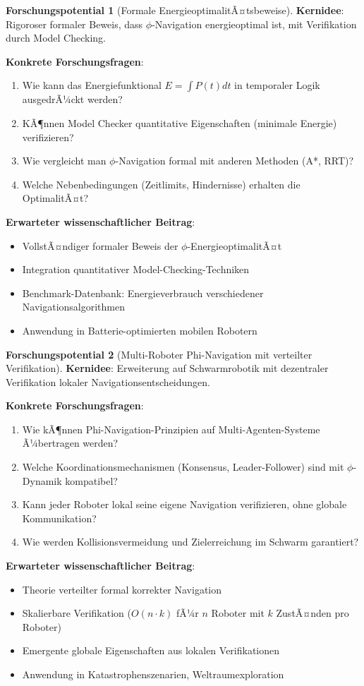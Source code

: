 ﻿\documentclass[a4paper,12pt]{article}
\theoremstyle{definition}
\newtheorem{potential}{Forschungspotential}[section]
\begin{document}
\begin{potential}[Formale EnergieoptimalitÃ¤tsbeweise]
\textbf{Kernidee}: Rigoroser formaler Beweis, dass $\phi$-Navigation energieoptimal ist, mit Verifikation durch Model Checking.

\textbf{Konkrete Forschungsfragen}:
\begin{enumerate}
	\item Wie kann das Energiefunktional $E = \int P(t) dt$ in temporaler Logik ausgedrÃ¼ckt werden?
	\item KÃ¶nnen Model Checker quantitative Eigenschaften (minimale Energie) verifizieren?
	\item Wie vergleicht man $\phi$-Navigation formal mit anderen Methoden (A*, RRT)?
	\item Welche Nebenbedingungen (Zeitlimits, Hindernisse) erhalten die OptimalitÃ¤t?
\end{enumerate}

\textbf{Erwarteter wissenschaftlicher Beitrag}:
\begin{itemize}
	\item VollstÃ¤ndiger formaler Beweis der $\phi$-EnergieoptimalitÃ¤t
	\item Integration quantitativer Model-Checking-Techniken
	\item Benchmark-Datenbank: Energieverbrauch verschiedener Navigationsalgorithmen
	\item Anwendung in Batterie-optimierten mobilen Robotern
\end{itemize}
\end{potential}

\begin{potential}[Multi-Roboter Phi-Navigation mit verteilter Verifikation]
\textbf{Kernidee}: Erweiterung auf Schwarmrobotik mit dezentraler Verifikation lokaler Navigationsentscheidungen.

\textbf{Konkrete Forschungsfragen}:
\begin{enumerate}
	\item Wie kÃ¶nnen Phi-Navigation-Prinzipien auf Multi-Agenten-Systeme Ã¼bertragen werden?
	\item Welche Koordinationsmechanismen (Konsensus, Leader-Follower) sind mit $\phi$-Dynamik kompatibel?
	\item Kann jeder Roboter lokal seine eigene Navigation verifizieren, ohne globale Kommunikation?
	\item Wie werden Kollisionsvermeidung und Zielerreichung im Schwarm garantiert?
\end{enumerate}

\textbf{Erwarteter wissenschaftlicher Beitrag}:
\begin{itemize}
	\item Theorie verteilter formal korrekter Navigation
	\item Skalierbare Verifikation ($O(n \cdot k)$ fÃ¼r $n$ Roboter mit $k$ ZustÃ¤nden pro Roboter)
	\item Emergente globale Eigenschaften aus lokalen Verifikationen
	\item Anwendung in Katastrophenszenarien, Weltraumexploration
\end{itemize}
\end{potential}
\end{document}
